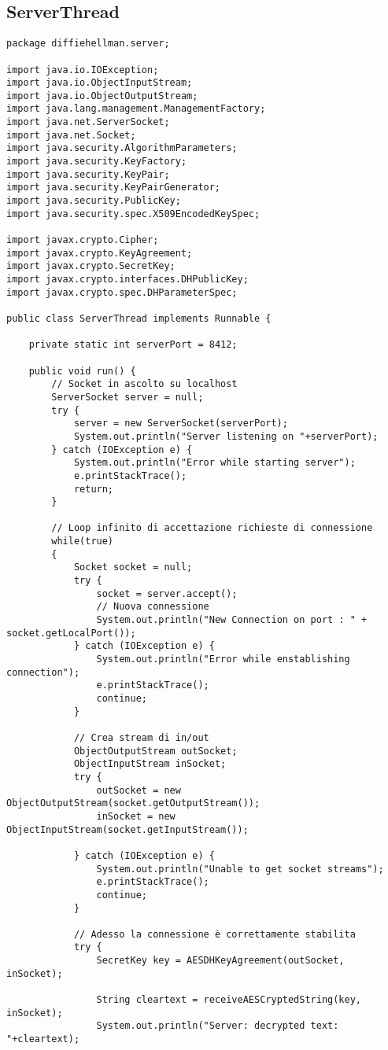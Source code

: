 \documentclass[12pt]{article}
\begin{document}
\subsection*{ServerThread}
\begin{lstlisting}
package diffiehellman.server;

import java.io.IOException;
import java.io.ObjectInputStream;
import java.io.ObjectOutputStream;
import java.lang.management.ManagementFactory;
import java.net.ServerSocket;
import java.net.Socket;
import java.security.AlgorithmParameters;
import java.security.KeyFactory;
import java.security.KeyPair;
import java.security.KeyPairGenerator;
import java.security.PublicKey;
import java.security.spec.X509EncodedKeySpec;

import javax.crypto.Cipher;
import javax.crypto.KeyAgreement;
import javax.crypto.SecretKey;
import javax.crypto.interfaces.DHPublicKey;
import javax.crypto.spec.DHParameterSpec;

public class ServerThread implements Runnable {

	private static int serverPort = 8412;

	public void run() {
		// Socket in ascolto su localhost
		ServerSocket server = null;
		try {
			server = new ServerSocket(serverPort);
			System.out.println("Server listening on "+serverPort);
		} catch (IOException e) {
			System.out.println("Error while starting server");
			e.printStackTrace();
			return;
		}

		// Loop infinito di accettazione richieste di connessione
		while(true)
		{
			Socket socket = null;
			try {
				socket = server.accept();
				// Nuova connessione
				System.out.println("New Connection on port : " + socket.getLocalPort());
			} catch (IOException e) {
				System.out.println("Error while enstablishing connection");
				e.printStackTrace();
				continue;
			}

			// Crea stream di in/out
			ObjectOutputStream outSocket;
			ObjectInputStream inSocket;
			try {
				outSocket = new ObjectOutputStream(socket.getOutputStream());
				inSocket = new ObjectInputStream(socket.getInputStream());

			} catch (IOException e) {
				System.out.println("Unable to get socket streams");
				e.printStackTrace();
				continue;
			}

			// Adesso la connessione è correttamente stabilita
			try {
				SecretKey key = AESDHKeyAgreement(outSocket, inSocket);

				String cleartext = receiveAESCryptedString(key, inSocket);
				System.out.println("Server: decrypted text: "+cleartext);


\end{lstlisting}
\end{document}
